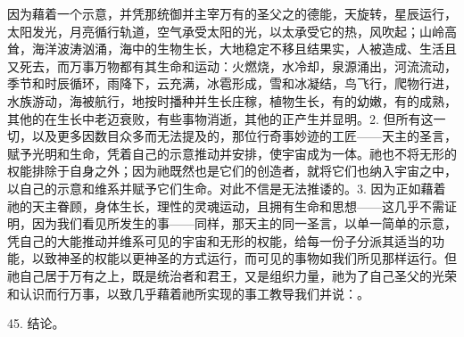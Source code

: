 \par

因为藉着一个示意，并凭那统御并主宰万有的圣父之的德能，天旋转，星辰运行，太阳发光，月亮循行轨道，空气承受太阳的光，以太承受它的热，风吹起；山岭高耸，海洋波涛汹涌，海中的生物生长，大地稳定不移且结果实，人被造成、生活且又死去，而万事万物都有其生命和运动：火燃烧，水冷却，泉源涌出，河流流动，季节和时辰循环，雨降下，云充满，冰雹形成，雪和冰凝结，鸟飞行，爬物行进，水族游动，海被航行，地按时播种并生长庄稼，植物生长，有的幼嫩，有的成熟，其他的在生长中老迈衰败，有些事物消逝，其他的正产生并显明。\newline{}2. 但所有这一切，以及更多因数目众多而无法提及的，那位行奇事妙迹的工匠——天主的圣言，赋予光明和生命，凭着自己的示意推动并安排，使宇宙成为一体。祂也不将无形的权能排除于自身之外；因为祂既然也是它们的创造者，就将它们也纳入宇宙之中，以自己的示意和维系并赋予它们生命。对此不信是无法推诿的。\newline{}3. 因为正如藉着祂的天主眷顾，身体生长，理性的灵魂运动，且拥有生命和思想——这几乎不需证明，因为我们看见所发生的事——同样，那天主的同一圣言，以单一简单的示意，凭自己的大能推动并维系可见的宇宙和无形的权能，给每一份子分派其适当的功能，以致神圣的权能以更神圣的方式运行，而可见的事物如我们所见那样运行。但祂自己居于万有之上，既是统治者和君王，又是组织力量，祂为了自己圣父的光荣和认识而行万事，以致几乎藉着祂所实现的事工教导我们并说：。\par

45. 结论。\par

